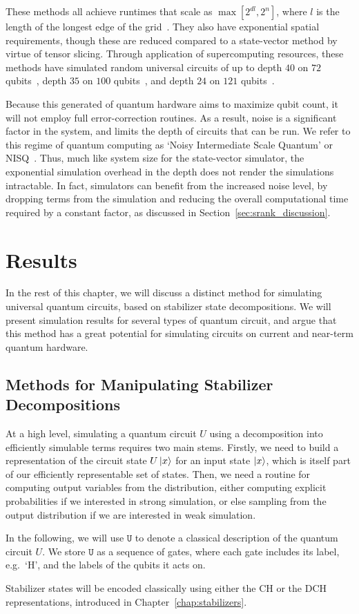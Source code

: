 These methods all achieve runtimes that scale as $\max \left[ 2^{dl}, 2^{n}\right]$, where $l$ is the length of the longest edge of the grid~\cite{Markov2005}. They also have exponential spatial requirements, though these are reduced compared to a state-vector method by virtue of tensor slicing. Through application of supercomputing resources, these methods have simulated random universal circuits of up to depth $40$ on $72$ qubits~\cite{Villalonga2018}, depth $35$ on $100$ qubits~\cite{Chen2018}, and depth $24$ on $121$ qubits~\cite{Villalonga2019}.\par
Because this generated of quantum hardware aims to  maximize qubit count, it will not employ full error-correction routines. As a result, noise is a significant factor in the system, and limits the depth of circuits that can be run. We refer to this regime of quantum computing as `Noisy Intermediate Scale Quantum' or NISQ~\cite{Preskill2018}. Thus, much like system size for the state-vector simulator, the exponential simulation overhead in the depth does not render the simulations intractable. In fact, simulators can benefit from the increased noise level, by dropping terms from the simulation and reducing the overall computational time required by a constant factor, as discussed in Section~\ref{sec:srank_discussion}.
\section{Results}
In the rest of this chapter, we will discuss a distinct method for simulating universal quantum circuits, based on stabilizer state decompositions. We will present simulation results for several types of quantum circuit, and argue that this method has a great potential for simulating circuits on current and near-term quantum hardware.\par
\subsection{Methods for Manipulating Stabilizer Decompositions}
At a high level, simulating a quantum circuit $U$ using a decomposition into efficiently simulable terms requires two main stems. Firstly, we need to build a representation of the circuit state $U\ket{x}$ for an input state $\ket{x}$, which is itself part of our efficiently representable set of states. Then, we need a routine for computing output variables from the distribution, either computing explicit probabilities if we interested in strong simulation, or else sampling from the output distribution if we are interested in weak simulation.\par
In the following, we will use $\mathtt{U}$ to denote a classical description of the quantum circuit $U$. We store $\mathtt{U}$ as a sequence of gates, where each gate includes its label, e.g.\ `H', and the labels of the qubits it acts on.\par
Stabilizer states will be encoded classically using either the CH or the DCH representations, introduced in Chapter~\ref{chap:stabilizers}.
